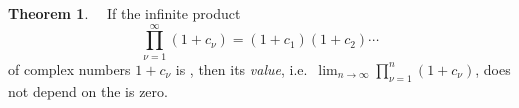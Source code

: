 \documentclass[12pt]{article}
\theoremstyle{definition}
\newtheorem*{thmplain}{Theorem}
\begin{document}
\begin{thmplain}
\, \, If the infinite product
$$\prod_{\nu=1}^\infty (1\!+\!c_\nu) = (1\!+\!c_1)(1\!+\!c_2)\cdots$$
of complex numbers $1\!+\!c_\nu$ is , then its {\em value}, i.e.\, $\displaystyle\lim_{n\to\infty}\prod_{\nu=1}^n (1\!+\!c_\nu)$, does not depend on the  is zero.
\end{thmplain}
\end{document}

